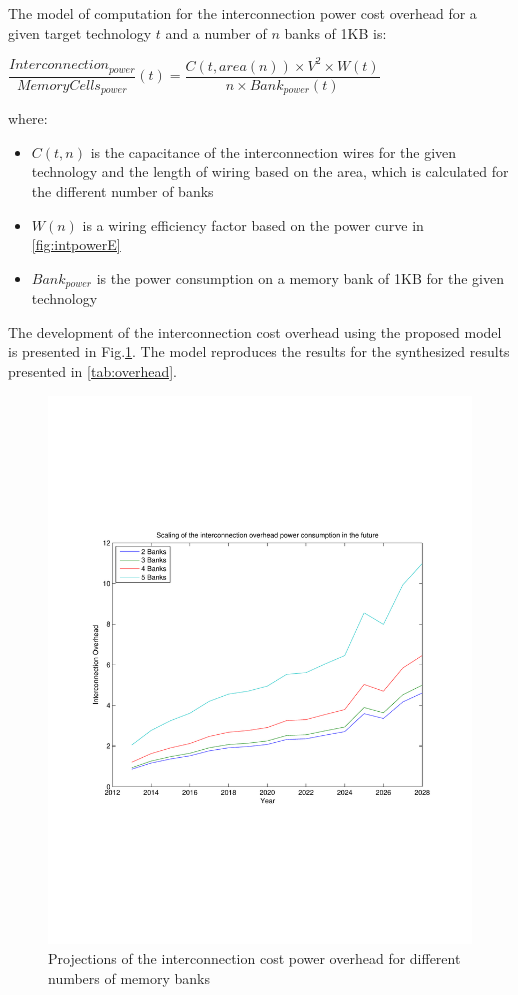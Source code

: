  The model of computation for the interconnection power cost overhead for a given target technology $ t $ and a number of $ n $ banks of 1KB  is:
 
 \begin{center}
 $ \dfrac{Interconnection_{power}}{MemoryCells_{power}}(t) = \dfrac{C(t,area(n)) \times V^{2} \times W(t) }{n \times Bank_{power}(t)} $ 
  \end{center}
  
 where:

 \begin{itemize}
 \item $C(t,n)$ is the capacitance of the interconnection wires for the given technology and the length of wiring based on the area, which is calculated for the different number of banks
 \item $ W(n) $ is a wiring efficiency factor based on the power curve in \ref{fig:intpowerE}
 \item $ Bank_{power} $ is the power consumption on a memory bank of 1KB for the given technology
 \end{itemize}
 
 The development of the interconnection cost overhead using the proposed model is presented in Fig.\ref{fig:overheadE}.
 The model reproduces the results for the synthesized results presented in \ref{tab:overhead}.

 \begin{figure}
 \centering
 \includegraphics[width = \textwidth]{E/overhead.pdf}
  \caption{Projections of the interconnection cost power overhead for different numbers of memory banks}
 \label{fig:overheadE}
 \end{figure}

